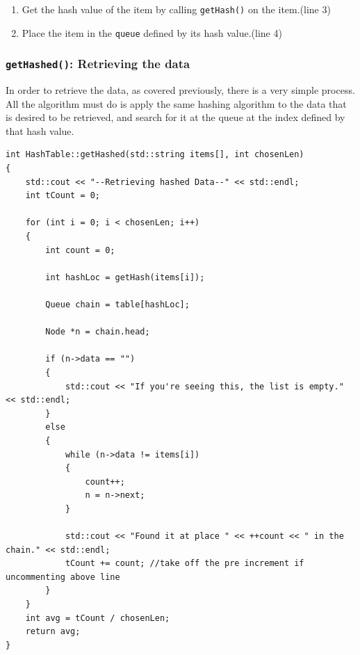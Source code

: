 \documentclass[letterpaper, 10pt]{article}
\begin{document}
\begin{enumerate}
    \item Get the hash value of the item by calling \texttt{getHash()} on the item.(line 3)
    \item Place the item in the \texttt{queue} defined by its hash value.(line 4)
\end{enumerate}

\subsubsection{\texttt{getHashed()}: Retrieving the data}

In order to retrieve the data, as covered previously, there is a very simple process. All the algorithm must do is apply the same hashing algorithm to the data that is desired to be retrieved, and search for it at the queue at the index defined by that hash value. 

\begin{addmargin}[-5em]{1em}
\begin{small}
\begin{verbatim}
int HashTable::getHashed(std::string items[], int chosenLen)
{
	std::cout << "--Retrieving hashed Data--" << std::endl;
	int tCount = 0;

	for (int i = 0; i < chosenLen; i++)
	{
		int count = 0;

		int hashLoc = getHash(items[i]);

		Queue chain = table[hashLoc];

		Node *n = chain.head;
	
		if (n->data == "")
		{
			std::cout << "If you're seeing this, the list is empty." << std::endl;
		}
		else
		{
			while (n->data != items[i])
			{
				count++;
				n = n->next;
			}

			std::cout << "Found it at place " << ++count << " in the chain." << std::endl;
			tCount += count; //take off the pre increment if uncommenting above line
		}
	}
	int avg = tCount / chosenLen;
	return avg;
}

\end{verbatim}
\end{small}
\end{addmargin}
\end{document}
